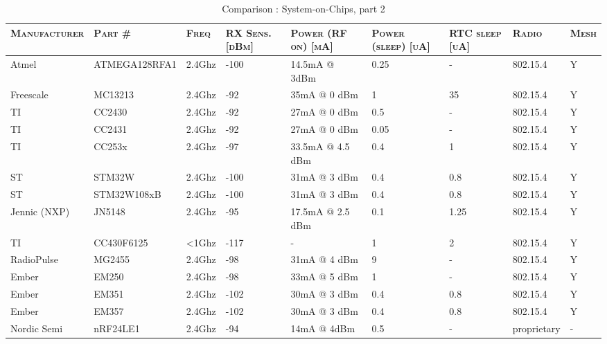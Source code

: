    \begin{sidewaystable}[h]
     \centering
     \begin{tabularx}{0.95\textwidth}{l l l p{1.5cm} p{3.5cm} p{2.1cm} p{1.8cm} l l}
       \toprule
       \textsc{Manufacturer}
       & \textsc{Part \#}
       & \textsc{Freq}
       & \textsc{RX Sens. [dBm]}
       & \textsc{Power (RF on) [mA]}
       & \textsc{Power (sleep) [uA]}
       & \textsc{RTC sleep [uA]}
       & \textsc{Radio}
       & \textsc{Mesh}
        \\ \hline

        Atmel        & ATMEGA128RFA1 & 2.4Ghz & -100    & 14.5mA @ 3dBm    & 0.25   & -     & 802.15.4 & Y      \\ 
        Freescale    & MC13213       & 2.4Ghz & -92     & 35mA @ 0 dBm     & 1      & 35    & 802.15.4 & Y      \\ 
        TI           & CC2430        & 2.4Ghz & -92     & 27mA @ 0 dBm     & 0.5    & -     & 802.15.4 & Y      \\ 
        TI           & CC2431        & 2.4Ghz & -92     & 27mA @ 0 dBm     & 0.05   & -     & 802.15.4 & Y      \\ 
        TI           & CC253x        & 2.4Ghz & -97     & 33.5mA @ 4.5 dBm & 0.4    & 1     & 802.15.4 & Y      \\ 
        ST           & STM32W        & 2.4Ghz & -100    & 31mA @ 3 dBm     & 0.4    & 0.8   & 802.15.4 & Y      \\ 
        ST           & STM32W108xB   & 2.4Ghz & -100    & 31mA @ 3 dBm     & 0.4    & 0.8   & 802.15.4 & Y      \\ 
        Jennic (NXP) & JN5148        & 2.4Ghz & -95     & 17.5mA @ 2.5 dBm & 0.1    & 1.25  & 802.15.4 & Y      \\ 
        TI           & CC430F6125    & <1Ghz  & -117    & -                & 1      & 2     & 802.15.4 & Y      \\ 
        RadioPulse   & MG2455        & 2.4Ghz & -98     & 31mA @ 4 dBm     & 9      & -     & 802.15.4 & Y      \\ 
        Ember        & EM250         & 2.4Ghz & -98     & 33mA @ 5 dBm     & 1      & -     & 802.15.4 & Y      \\ 
        Ember        & EM351         & 2.4Ghz & -102    & 30mA @ 3 dBm     & 0.4    & 0.8   & 802.15.4 & Y      \\ 
        Ember        & EM357         & 2.4Ghz & -102    & 30mA @ 3 dBm     & 0.4    & 0.8   & 802.15.4 & Y      \\ 
        Nordic Semi  & nRF24LE1      & 2.4Ghz & -94     & 14mA @ 4dBm      & 0.5    & -     & proprietary & -   \\

        \bottomrule
      \end{tabularx}
     \caption{Comparison : System-on-Chips, part 2}
     \label{tab:soc-comparison-2}
   \end{sidewaystable}

